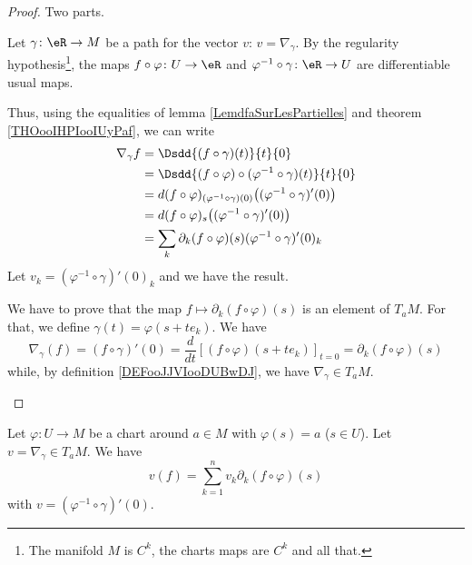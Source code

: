 \begin{proof}
	Two parts.
	\begin{subproof}
		\spitem[\( \Rightarrow\)]
		Let \( \gamma\colon \eR\to M\) be a path for the vector \( v\): \( v=\nabla_{\gamma}\). By the regularity hypothesis\footnote{The manifold \( M\) is \( C^k\), the charts maps are \( C^k\) and all that.}, the maps \( f\circ \varphi\colon U\to \eR\) and \( \varphi^{-1}\circ\gamma\colon \eR \to U \) are differentiable usual maps.

		Thus, using the equalities of lemma \ref{LemdfaSurLesPartielles} and theorem \ref{THOooIHPIooIUyPaf}, we can write
		\begin{subequations}
			\begin{align}
				\nabla_{\gamma}f & =\Dsdd{ (f\circ\gamma)(t) }{t}{0}                                                          \\
				                 & =\Dsdd{ (f\circ\varphi)\circ(\varphi^{-1}\circ\gamma)(t) }{t}{0}                           \\
				                 & =d(f\circ \varphi)_{(\varphi^{-1}\circ\gamma)(0)}\big( (\varphi^{-1}\circ\gamma)'(0) \big) \\
				                 & =d(f\circ \varphi)_{s}\big( (\varphi^{-1}\circ\gamma)'(0) \big)                            \\
				                 & =\sum_k\partial_k(f\circ \varphi)(s)(\varphi^{-1}\circ\gamma)'(0)_k
			\end{align}
		\end{subequations}
		Let \( v_k=(\varphi^{-1}\circ\gamma)'(0)_k\) and we have the result.

		\spitem[$ \Leftarrow$ ]
		We have to prove that the map \( f\mapsto \partial_k(f\circ\varphi)(s)\) is an element of \( T_aM\). For that, we define \( \gamma(t)=\varphi(s+te_k)\). We have
		\begin{equation}
			\nabla_{\gamma}(f)=(f\circ\gamma)'(0)=\frac{d}{dt} \left[ (f\circ\varphi)(s+te_k)  \right]_{t=0}=\partial_k(f\circ\varphi)(s)
		\end{equation}
		while, by definition \ref{DEFooJJVIooDUBwDJ}, we have \( \nabla_{\gamma}\in T_aM\).
	\end{subproof}
\end{proof}




\begin{lemma}       \label{LEMooZXEFooZgXbNP}
	Let \( \varphi\colon U\to M\) be a chart around \( a\in M\) with \( \varphi(s)=a\) (\( s\in U\)). Let \( v=\nabla_{\gamma}\in T_aM\). We have
	\begin{equation}
		v(f)=\sum_{k=1}^nv_k\partial_k(f\circ \varphi)(s)
	\end{equation}
	with \( v= (\varphi^{-1}\circ \gamma)'(0)\).
\end{lemma}

